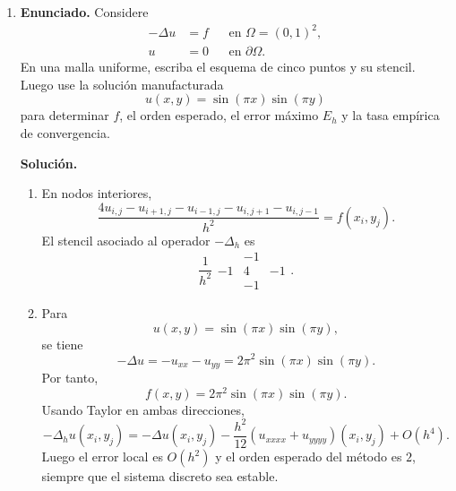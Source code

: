 \documentclass[11pt]{article}
\begin{document}
\begin{enumerate}[label=\textbf{\arabic*.}, leftmargin=*]

    \item \textbf{Enunciado.} Considere
    \[
    \begin{aligned}
        -\Delta u&=f &&\text{en }\Omega=(0,1)^2,\\
        u&=0 &&\text{en }\partial\Omega.
    \end{aligned}
    \]
    En una malla uniforme, escriba el esquema de cinco puntos y su stencil. Luego use la solución manufacturada
    \[
        u(x,y)=\sin(\pi x)\sin(\pi y)
    \]
    para determinar $f$, el orden esperado, el error máximo $E_h$ y la tasa empírica de convergencia.

    \textbf{Solución.}
    \begin{enumerate}[label=(\alph*)]
        \item En nodos interiores,
        \[
            \frac{4u_{i,j}-u_{i+1,j}-u_{i-1,j}-u_{i,j+1}-u_{i,j-1}}{h^2}
            =
            f(x_i,y_j).
        \]
        El stencil asociado al operador $-\Delta_h$ es
        \[
            \frac1{h^2}
            \begin{array}{ccc}
                & -1 & \\
                -1 & 4 & -1\\
                & -1 &
            \end{array}.
        \]

        \item Para
        \[
            u(x,y)=\sin(\pi x)\sin(\pi y),
        \]
        se tiene
        \[
            -\Delta u
            =
            -u_{xx}-u_{yy}
            =
            2\pi^2\sin(\pi x)\sin(\pi y).
        \]
        Por tanto,
        \[
            f(x,y)=2\pi^2\sin(\pi x)\sin(\pi y).
        \]
        Usando Taylor en ambas direcciones,
        \[
            -\Delta_h u(x_i,y_j)
            =
            -\Delta u(x_i,y_j)
            -\frac{h^2}{12}\left(u_{xxxx}+u_{yyyy}\right)(x_i,y_j)
            +O(h^4).
        \]
        Luego el error local es $O(h^2)$ y el orden esperado del método es $2$, siempre que el sistema discreto sea estable.


\end{enumerate}
\end{enumerate}
\end{document}
